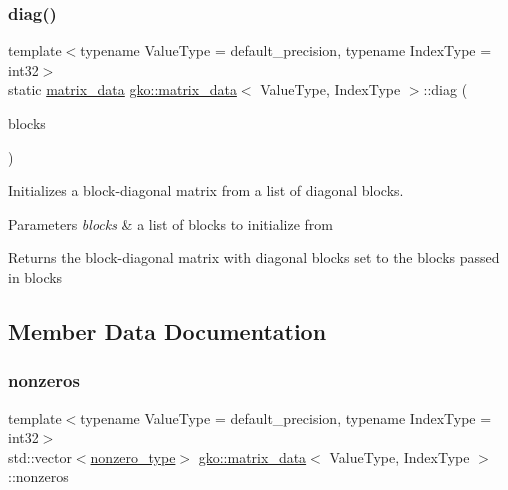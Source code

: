 \subsubsection{\texorpdfstring{diag()}{diag()}\hspace{0.1cm}{\footnotesize\ttfamily [5/5]}}
{\footnotesize\ttfamily template$<$typename Value\+Type = default\+\_\+precision, typename Index\+Type = int32$>$ \\
static \hyperlink{structgko_1_1matrix__data}{matrix\+\_\+data} \hyperlink{structgko_1_1matrix__data}{gko\+::matrix\+\_\+data}$<$ Value\+Type, Index\+Type $>$\+::diag (\begin{DoxyParamCaption}\item[{std\+::initializer\+\_\+list$<$ \hyperlink{structgko_1_1matrix__data}{matrix\+\_\+data}$<$ Value\+Type, Index\+Type $>$ $>$}]{blocks }\end{DoxyParamCaption})\hspace{0.3cm}{\ttfamily [static]}}



Initializes a block-\/diagonal matrix from a list of diagonal blocks. 


\begin{DoxyParams}{Parameters}
{\em blocks} & a list of blocks to initialize from\\
\hline
\end{DoxyParams}
\begin{DoxyReturn}{Returns}
the block-\/diagonal matrix with diagonal blocks set to the blocks passed in blocks 
\end{DoxyReturn}


\subsection{Member Data Documentation}
\mbox{\label{structgko_1_1matrix__data_a4f6be92270fa96bccdc502c83d248dc0}} 
\subsubsection{\texorpdfstring{nonzeros}{nonzeros}}
{\footnotesize\ttfamily template$<$typename Value\+Type = default\+\_\+precision, typename Index\+Type = int32$>$ \\
std\+::vector$<$\hyperlink{structgko_1_1matrix__data_1_1nonzero__type}{nonzero\+\_\+type}$>$ \hyperlink{structgko_1_1matrix__data}{gko\+::matrix\+\_\+data}$<$ Value\+Type, Index\+Type $>$\+::nonzeros}




